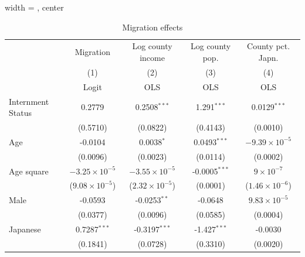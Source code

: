 \documentclass{beamer}
\begin{document}
\begin{frame}
  \begin{table}[htbp]
     \caption{\label{tbl:reg3} Migration effects}
     \begin{adjustbox}{width = \textwidth, center}
        \begin{tabular}{lcccc}
           \toprule
                               & Migration               & Log county income             & Log county pop.         & County pct. Japn.\\  
                               & (1)                     & (2)                           & (3)                     & (4)\\  
                               &  Logit                  & OLS                           & OLS                     & OLS\\  
           \midrule 
           Internment Status   & 0.2779                  & 0.2508$^{***}$                & 1.291$^{***}$           & 0.0129$^{***}$\\   
                               & (0.5710)                & (0.0822)                      & (0.4143)                & (0.0010)\\   
           Age                 & -0.0104                 & 0.0038$^{*}$                  & 0.0493$^{***}$          & $-9.39\times 10^{-5}$\\    
                               & (0.0096)                & (0.0023)                      & (0.0114)                & (0.0002)\\   
           Age square          & $-3.25\times 10^{-5}$   & $-3.55\times 10^{-5}$         & -0.0005$^{***}$         & $9\times 10^{-7}$\\    
                               & ($9.08\times 10^{-5}$)  & ($2.32\times 10^{-5}$)        & (0.0001)                & ($1.46\times 10^{-6}$)\\    
           Male                & -0.0593                 & -0.0253$^{**}$                & -0.0648                 & $9.83\times 10^{-5}$\\    
                               & (0.0377)                & (0.0096)                      & (0.0585)                & (0.0004)\\   
           Japanese            & 0.7287$^{***}$          & -0.3197$^{***}$               & -1.427$^{***}$          & -0.0030\\   
                               & (0.1841)                & (0.0728)                      & (0.3310)                & (0.0020)\\   

\end{tabular}
\end{adjustbox}
\end{table}
\end{frame}
\end{document}
